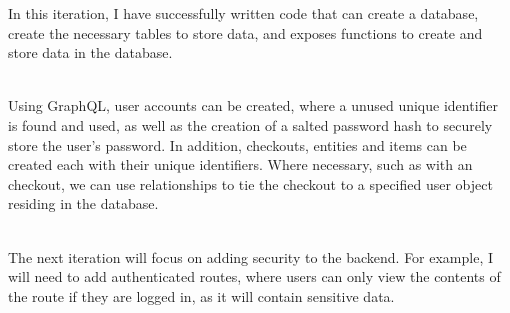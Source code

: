 \documentclass[../../main.tex]{subfiles}
\begin{document}
\noindent In this iteration, I have successfully written code that can create a database, create the necessary tables to store data, and exposes functions to create and store data in the database.

\noindent \\ Using GraphQL, user accounts can be created, where a unused unique identifier is found and used, as well as the creation of a salted password hash to securely store the user's password. In addition, checkouts, entities and items can be created each with their unique identifiers. Where necessary, such as with an checkout, we can use relationships to tie the checkout to a specified user object residing in the database.

\noindent \\ The next iteration will focus on adding security to the backend. For example, I will need to add authenticated routes, where users can only view the contents of the route if they are logged in, as it will contain sensitive data.
\end{document}

